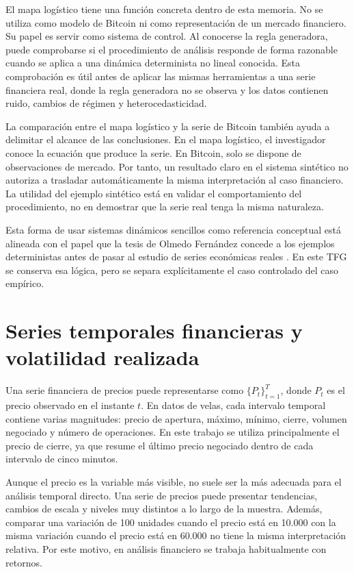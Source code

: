 El mapa logístico tiene una función concreta dentro de esta memoria. No se utiliza como modelo de Bitcoin ni como representación de un mercado financiero. Su papel es servir como sistema de control. Al conocerse la regla generadora, puede comprobarse si el procedimiento de análisis responde de forma razonable cuando se aplica a una dinámica determinista no lineal conocida. Esta comprobación es útil antes de aplicar las mismas herramientas a una serie financiera real, donde la regla generadora no se observa y los datos contienen ruido, cambios de régimen y heterocedasticidad.

La comparación entre el mapa logístico y la serie de Bitcoin también ayuda a delimitar el alcance de las conclusiones. En el mapa logístico, el investigador conoce la ecuación que produce la serie. En Bitcoin, solo se dispone de observaciones de mercado. Por tanto, un resultado claro en el sistema sintético no autoriza a trasladar automáticamente la misma interpretación al caso financiero. La utilidad del ejemplo sintético está en validar el comportamiento del procedimiento, no en demostrar que la serie real tenga la misma naturaleza.

Esta forma de usar sistemas dinámicos sencillos como referencia conceptual está alineada con el papel que la tesis de Olmedo Fernández concede a los ejemplos deterministas antes de pasar al estudio de series económicas reales \cite{olmedo2001}. En este TFG se conserva esa lógica, pero se separa explícitamente el caso controlado del caso empírico.

\section{Series temporales financieras y volatilidad realizada}\label{sec:series-financieras-volatilidad}

Una serie financiera de precios puede representarse como \(\{P_t\}_{t=1}^{T}\), donde \(P_t\) es el precio observado en el instante \(t\). En datos de velas, cada intervalo temporal contiene varias magnitudes: precio de apertura, máximo, mínimo, cierre, volumen negociado y número de operaciones. En este trabajo se utiliza principalmente el precio de cierre, ya que resume el último precio negociado dentro de cada intervalo de cinco minutos.

Aunque el precio es la variable más visible, no suele ser la más adecuada para el análisis temporal directo. Una serie de precios puede presentar tendencias, cambios de escala y niveles muy distintos a lo largo de la muestra. Además, comparar una variación de 100 unidades cuando el precio está en 10.000 con la misma variación cuando el precio está en 60.000 no tiene la misma interpretación relativa. Por este motivo, en análisis financiero se trabaja habitualmente con retornos.

